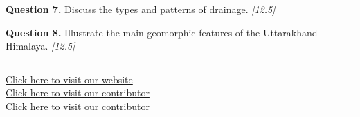 \documentclass[11pt,a4paper]{article}
\newcommand{\pts}[1]{\hfill   \textit{[#1]}}
\begin{document}
\medskip


\noindent   \textbf{Question 7.} Discuss the types and patterns of drainage. \pts{12.5}

\medskip


\noindent   \textbf{Question 8.} Illustrate the main geomorphic features of the Uttarakhand Himalaya. \pts{12.5}

\vfill\rule{\linewidth}{0.4pt}

\begin{center}\small
\href{https://bhu-exam.vercel.app/}{Click here to visit our website}\\[4pt]
\href{https://me-aryan.vercel.app/}{Click here to visit our contributor}\\[4pt]
\href{https://quashan-me.vercel.app/}{Click here to visit our contributor}
\end{center}
\end{document}
